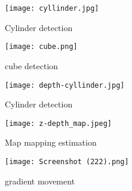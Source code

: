 \documentclass{article}
\begin{document}
\begin{figure}
    \centering
        \texttt{[image: cyllinder.jpg]}
        \caption{Cylinder detection}
\end{figure}


\begin{figure}
    \centering
        \texttt{[image: cube.png]}
        \caption{cube detection}
\end{figure}


\begin{figure}
    \centering
        \texttt{[image: depth-cyllinder.jpg]}
        \caption{Cylinder detection}
\end{figure}


\begin{figure}
    \centering
        \texttt{[image: z-depth\_map.jpeg]}
        \caption{Map mapping estimation}
\end{figure}


\begin{figure}
    \centering
    \texttt{[image: Screenshot (222).png]}
    \caption{gradient movement}
    \label{fig:enter-label}
\end{figure}
\end{document}
